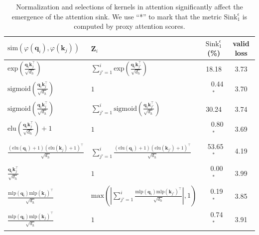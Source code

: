 \documentclass{article} \usepackage{iclr2025_conference,times}
\begin{document}
\begin{table}[t]
\vspace{-1.1cm}
\caption{Normalization and selections of kernels in attention significantly affect the emergence of the attention sink. We use ``*'' to mark that the metric $\textrm{Sink}_1^{\epsilon}$ is computed by proxy attention scores.}
\vspace{-.2cm}
\begin{center}
\begin{tabular}{l|l|cc}
\toprule
  $\textrm{sim}(\varphi(\boldsymbol{q}_i)\textrm{,}\,\varphi(\boldsymbol{k}_j))$ & $\boldsymbol{Z}_i$ & $\textrm{Sink}_1^{\epsilon}$(\%) & valid loss \\
\midrule
 $\textrm{exp}(\frac{\boldsymbol{q}_i\boldsymbol{k}_j^\top}{\sqrt{d_h}})$ & $\sum_{j'=1}^i \textrm{exp}(\frac{\boldsymbol{q}_i\boldsymbol{k}_{j'}^\top}{\sqrt{d_h}})$ & 18.18 & 3.73 \\
 $\textrm{sigmoid}(\frac{\boldsymbol{q}_i\boldsymbol{k}_j^\top}{\sqrt{d_h}})$ & $1$ & \,\,\,\,\,\,0.44$^*$ &  3.70 \\
$\textrm{sigmoid}(\frac{\boldsymbol{q}_i\boldsymbol{k}_j^\top}{\sqrt{d_h}})$ & $\sum_{j'=1}^i \textrm{sigmoid}(\frac{\boldsymbol{q}_i\boldsymbol{k}_{j'}^\top}{\sqrt{d_h}})$ & 30.24 & 3.74 \\
 $\textrm{elu}(\frac{\boldsymbol{q}_i\boldsymbol{k}_j^\top}{\sqrt{d_h}})+1$ & $1$ & \,\,\,\,\,\,0.80$^*$ &  3.69 \\ 
\midrule
$\frac{(\textrm{elu}(\boldsymbol{q}_i)+1)(\textrm{elu}(\boldsymbol{k}_j)+1)^\top}{\sqrt{d_h}}$ & $\sum_{j'=1}^i\frac{(\textrm{elu}(\boldsymbol{q}_i)+1)(\textrm{elu}(\boldsymbol{k}_{j'})+1)^\top}{\sqrt{d_h}}$ & \,\,\,53.65$^*$ & 4.19\\ 
$\frac{\boldsymbol{q}_i\boldsymbol{k}_{j}^\top}{\sqrt{d_h}}$ & $1$ & \,\,\,\,\,0.00$^*$ & 3.99 \\
$\frac{\textrm{mlp}(\boldsymbol{q}_i)\textrm{mlp}(\boldsymbol{k}_j)^\top}{\sqrt{d_h}}$ &  $\textrm{max}\left(\left|\sum_{j'=1}^i\frac{\textrm{mlp}(\boldsymbol{q}_i)\textrm{mlp}(\boldsymbol{k}_{j'})^\top}{\sqrt{d_h}}\right|\textrm{,}\,1\right)$ & \,\,\,\,\,0.19$^*$ &  3.85\\
$\frac{\textrm{mlp}(\boldsymbol{q}_i)\textrm{mlp}(\boldsymbol{k}_j)^\top}{\sqrt{d_h}}$ & $1$ & \,\,\,\,\,0.74$^*$ & 3.91 \\
\bottomrule
\end{tabular}
\end{center}
\vspace{-.2cm}
\label{operation}
\end{table}
\end{document}
